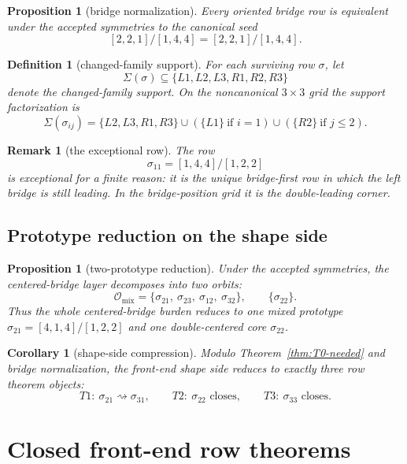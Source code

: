 \documentclass[11pt]{article}
\newtheorem{proposition}[theorem]{Proposition}
\newtheorem{corollary}[theorem]{Corollary}
\newtheorem{remark}[theorem]{Remark}
\newtheorem{definition}[theorem]{Definition}
\newcommand{\sig}[2]{\sigma_{#1#2}}
\newcommand{\CanL}{[2,2,1]}
\newcommand{\CanR}{[1,4,4]}
\newcommand{\CanSeed}{\CanL/\CanR}
\newcommand{\Omix}{\mathcal O_{\mathrm{mix}}}
\begin{document}
\begin{proposition}[bridge normalization]
\label{prop:bridge-normalization}
Every oriented bridge row is equivalent under the accepted symmetries to the
canonical seed
\[
\CanSeed=[2,2,1]/[1,4,4].
\]
\end{proposition}

\begin{definition}[changed-family support]
For each surviving row \(\sigma\), let
\[
\Sigma(\sigma)\subseteq\{L1,L2,L3,R1,R2,R3\}
\]
denote the changed-family support.
On the noncanonical \(3\times 3\) grid the support factorization is
\[
\Sigma(\sig{i}{j})
=
\{L2,L3,R1,R3\}
\cup (\{L1\}\ \text{if } i=1)
\cup (\{R2\}\ \text{if } j\le 2).
\]
\end{definition}

\begin{remark}[the exceptional row]
The row
\[
\sig11=[1,4,4]/[1,2,2]
\]
is exceptional for a finite reason:
it is the unique bridge-first row in which the left bridge is still leading.
In the bridge-position grid it is the double-leading corner.
\end{remark}

\subsection{Prototype reduction on the shape side}

\begin{proposition}[two-prototype reduction]
\label{prop:two-prototypes}
Under the accepted symmetries, the centered-bridge layer decomposes into two
orbits:
\[
\Omix=
\{\sig21,\ \sig23,\ \sig12,\ \sig32\},
\qquad
\{\sig22\}.
\]
Thus the whole centered-bridge burden reduces to one mixed prototype
\(\sig21=[4,1,4]/[1,2,2]\) and one double-centered core \(\sig22\).
\end{proposition}

\begin{corollary}[shape-side compression]
\label{cor:shape-side-compression}
Modulo Theorem~\ref{thm:T0-needed} and bridge normalization, the front-end shape side
reduces to exactly three row theorem objects:
\[
T1:\ \sig21\rightsquigarrow \sig31,\qquad
T2:\ \sig22\text{ closes},\qquad
T3:\ \sig33\text{ closes}.
\]
\end{corollary}

\section{Closed front-end row theorems}
\label{sec:frontier}
\end{document}
